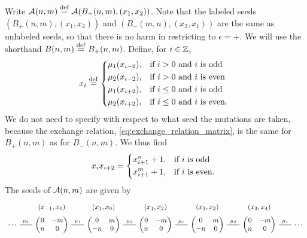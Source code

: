 \begin{example}
	Write $\mathcal{A}(n,m) \overset{\mathrm{def}}{=} \mathcal{A}(B_{+}(n,m), (x_1, x_2))$. Note that the labeled seeds
	$(B_{+}(n,m), (x_1, x_2))$ and $(B_{-}(m, n), (x_2, x_1))$ are the same as unlabeled
	seeds, so that there is no harm in restricting to $\epsilon = +$. We will use the
	shorthand $B(n,m) \overset{\mathrm{def}}{=} B_{+}(n,m)$. Define, for $i \in \mathbb{Z}$,
	\begin{equation*}
		x_i \defeq  \begin{dcases*}
			\mu_1 (x_{i-2}), & if $i > 0$ and $i$ is odd      \\
			\mu_2 (x_{i-2}), & if $i > 0$ and $i$ is even     \\
			\mu_1 (x_{i+2}), & if $i \leq 0$ and $i$ is odd   \\
			\mu_2 (x_{i+2}), & if $i \leq 0$ and $i$ is even.
		\end{dcases*}
	\end{equation*}
	We do not need to specify with respect to what seed the mutations are taken, because
	the exchange relation, \cref{eq:exchange_relation_matrix}, is the same for $B_{+}(n,m)$
	as for $B_{-}(n,m)$. We thus find
	\begin{equation}\label{eq:recurrence_rank2}
		x_i x_{i+2} = \begin{dcases*}
			x_{i+1}^n + 1, & if $i$ is odd   \\
			x_{i+1}^m + 1, & if $i$ is even.
		\end{dcases*}
	\end{equation}
	The seeds of $\mathcal{A}(n,m)$ are given by
	\begin{equation*}
		\begin{tikzcd}[sep=scriptsize, row sep= 0.1em, ampersand replacement=\&]
			\& (x_{-1}, x_0) \& (x_{1}, x_0) \& (x_1, x_2) \& (x_3, x_2) \& (x_3, x_4)\\
			\cdots \rar[dash, "\mu_2"] \&\begin{pmatrix}
				0 & -m \\
				n & 0
			\end{pmatrix}
			\rar[dash, "\mu_1"] \&\begin{pmatrix}
				0  & m \\
				-n & 0
			\end{pmatrix}
			\rar[dash, "\mu_2"] \&\begin{pmatrix}
				0 & -m \\
				n & 0
			\end{pmatrix}
			\rar[dash, "\mu_1"] \&\begin{pmatrix}
				0  & m \\
				-n & 0
			\end{pmatrix}
			\rar[dash, "\mu_2"] \&\begin{pmatrix}
				0 & -m \\
				n & 0
			\end{pmatrix}
			\rar[dash, "\mu_1"] \& \cdots
		\end{tikzcd}
	\end{equation*}


\end{example}
